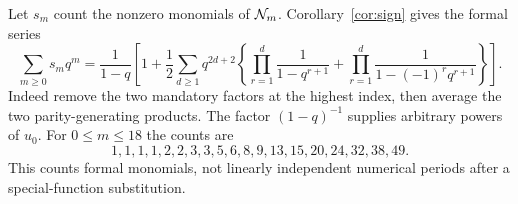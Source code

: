 Let $s_m$ count the nonzero monomials of $\mathcal N_m$. Corollary~\ref{cor:sign} gives the formal series
\begin{equation}\label{eq:support-series}
 \sum_{m\ge0}s_mq^m=
 \frac1{1-q}\left[1+\frac12\sum_{d\ge1}q^{2d+2}
 \left\{\prod_{r=1}^d\frac1{1-q^{r+1}}+
        \prod_{r=1}^d\frac1{1-(-1)^rq^{r+1}}\right\}\right].
\end{equation}
Indeed remove the two mandatory factors at the highest index, then average the two parity-generating products. The factor $(1-q)^{-1}$ supplies arbitrary powers of $u_0$. For $0\le m\le18$ the counts are
\[
 1,1,1,1,2,2,3,3,5,6,8,9,13,15,20,24,32,38,49.
\]
This counts formal monomials, not linearly independent numerical periods after a special-function substitution.
